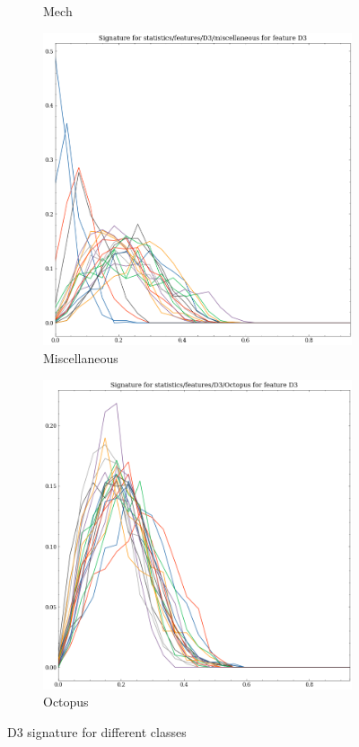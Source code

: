 \begin{figure}[t!p]
\begin{subfigure}[b]{0.23\textwidth}
        \caption{Mech}
    \end{subfigure}
    \hfill
    \begin{subfigure}[b]{0.23\textwidth}
        \includegraphics[width=\textwidth]{assets/feature_extraction/D3/miscellaneous.png}
        \caption{Miscellaneous}
    \end{subfigure}
    \hfill
    \begin{subfigure}[b]{0.23\textwidth}
        \includegraphics[width=\textwidth]{assets/feature_extraction/D3/Octopus.png}
        \caption{Octopus}
    \end{subfigure}
    \hfill
    \caption{D3 signature for different classes}
    \label{fig:D3-signatures-1}
\end{figure}

